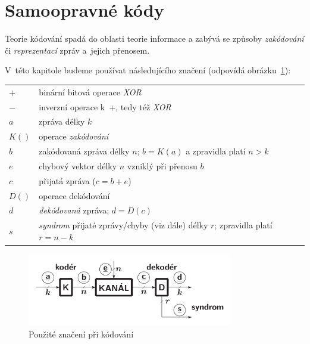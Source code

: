 \documentclass[thesis=M,czech,hidelinks]{FITthesis}[2012/06/26]
\newcommand{\0}{{\textcolor[gray]{0.75}{0}}}
\begin{document}
\section{Samoopravné kódy}\label{kap_samoopravne_kody}

Teorie kódování spadá do oblasti teorie informace a zabývá se způsoby
\emph{zakódování} či \emph{reprezentací} zpráv a~jejich přenosem.

V~této kapitole budeme používat následujícího značení (odpovídá
obrázku~\ref{obr_kodovani}):

\begin{center}
\begin{tabular}{l p{10cm}}
    $+$     &   binární bitová operace \emph{XOR} \\
    $-$     &   inverzní operace k~$+$, tedy též \emph{XOR} \\
    $a$     &   zpráva délky $k$ \\
    $K()$   &   operace \emph{zakódování} \\
    $b$     &   zakódovaná zpráva délky $n$; $b=K(a)$ a zpravidla platí $n>k$ \\
    $e$     &   chybový vektor délky $n$ vzniklý při přenosu $b$ \\
    $c$     &   přijatá zpráva ($c=b+e$) \\
    $D()$   &   operace dekódování \\
    $d$     &   \emph{dekódovaná} zpráva; $d=D(c)$ \\
    $s$     &   \emph{syndrom} přijaté zprávy/chyby (viz dále) délky $r$;
                zpravidla platí $r=n-k$ \\
\end{tabular}
\end{center}

\begin{figure}
    \centering
    \includegraphics[width=0.8\textwidth]{materialy/aak-kodovani.png}
    \caption{Použité značení při kódování~\cite{FIT_AAK}}
    \label{obr_kodovani}
\end{figure}
\end{document}
